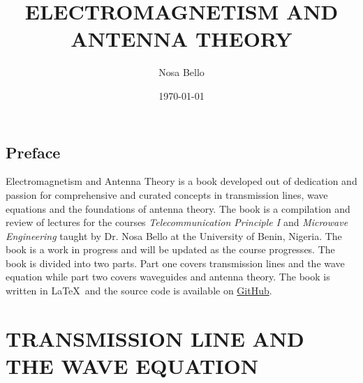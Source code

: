 \documentclass[a4paper,10pt, two column]{book}
\begin{document}
\author{Nosa Bello}
\title{ELECTROMAGNETISM AND ANTENNA THEORY}
\date{\today}

\frontmatter
\maketitle
\tableofcontents

\chapter{Preface}
Electromagnetism and Antenna Theory is a book developed out of dedication and passion for comprehensive and curated concepts in transmission lines, wave equations and the foundations of antenna theory. The book is a compilation and review of lectures for the courses \textit{Telecommunication Principle I} and \textit{Microwave Engineering} taught by Dr. Nosa Bello at the University of Benin, Nigeria. The book is a work in progress and will be updated as the course progresses. The book is divided into two parts. Part one covers transmission lines and the wave equation while part two covers waveguides and antenna theory. The book is written in \LaTeX\ and the source code is available on \href{https://github.com/allisonoge/electromagnetism-and-antenna-theory-v2.git}{GitHub}.

\mainmatter

\part{TRANSMISSION LINE AND THE WAVE EQUATION}


















 
 
 
 
 
 
 
 
 
 
 
 
 
 
 
 
 
 
 

\backmatter
\printindex

\shipoutAnswer
\end{document}
